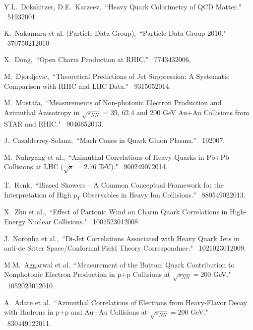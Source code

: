 \begin{thebibliography}{1000}
Y.L.~Dokshitzer, D.E.~Karzeev,~``Heavy Quark Colorimetry of QCD Matter." \Journal{\PLB} {~519}{3}{2001}

K.~Nakamura et al. (Particle Data Group),~``Particle Data Group 2010." \Journal{\JPG} {~37}{075021}{2010}

X.~Dong,~``Open Charm Production at RHIC." \Journal{\NPA} {~774}{343}{2006}.

M.~Djordjevic,~``Theoretical Predictions of Jet Suppression: A Systematic Comparison with RHIC and LHC Data." \Journal{\NPA} {~931}{505}{2014}.

M.~Mustafa,~``Measurements of Non-photonic Electron Production and Azimuthal Anisotropy in $\sqrt{s_{NN}}$ = 39, 62.4 and 200 GeV Au+Au Collisions from STAR and RHIC." \Journal{\NPA} {~904}{665}{2013}.

J.~Casalderrey-Solana,~``Mach Cones in Quark Gluon Plasma." \Journal{\JPG} {~10}{}{2007}.

M.~Nahrgang et al.,~``Azimuthal Correlations of Heavy Quarks in Pb+Pb Collisions at LHC ($\sqrt{s}$ = 2.76 TeV)." \Journal{\PRC} {~90}{024907}{2014}.

T.~Renk,~``Biased Showers -- A Common Conceptual Framework for the Interpretation of High $p_T$ Observables in Heavy Ion Collisions." \Journal{\PRC} {~88}{054902}{2013}.

X.~Zhu et al.,~``Effect of Partonic Wind on Charm Quark Correlations in High-Energy Nuclear Collisions." \Journal{\PRL} {~100}{152301}{2008}

J.~Noronha et al.,~``Di-Jet Correlations Associated with Heavy Quark Jets in anti-de Sitter Space/Conformal Field Theory Correspondnce." \Journal{\PRL} {~102}{102301}{2009}.

M.M.~Aggarwal et al.~``Measurement of the Bottom Quark Contribution to Nonphotonic Electron Production in p+p Collisions at $\sqrt{s_{NN}} = 200$ GeV." \Journal{\PRL} {~105}{202301}{2010}.

A.~Adare et al.~``Azimuthal Correlations of Electrons from Heavy-Flavor Decay with Hadrons in p+p and Au+Au Collisions at $\sqrt{s_{NN}} = 200$ GeV." \Journal{\PRC} {~83}{044912}{2011}.



\end{thebibliography}
